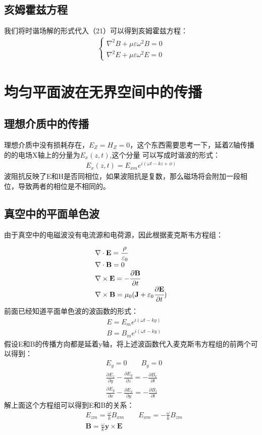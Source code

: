 \documentclass[UTF8]{article}
\begin{document}
\subsection{亥姆霍兹方程}
我们将时谐场解的形式代入（21）可以得到亥姆霍兹方程：
\begin{align}
    \begin{cases}
        \nabla^2 B + \mu \varepsilon \omega^2 B = 0\\
        \nabla^2 E + \mu \varepsilon \omega^2 E = 0
    \end{cases}
\end{align}
\section{均匀平面波在无界空间中的传播}
\subsection{理想介质中的传播}
理想介质中没有损耗存在，$E_Z=H_Z=0$，这个东西需要思考一下，延着Z轴传播的的电场X轴上的分量为$E_x(z,t)$,这个分量
可以写成时谐波的形式：
\begin{align}
    E_x(z,t)=E_{xm}e^{i(\omega t -kz+\phi)}
\end{align}
波阻抗反映了E和H是否同相位，如果波阻抗是复数，那么磁场将会附加一段相位，导致两者的相位是不相同的。
\subsection{真空中的平面单色波}
由于真空中的电磁波没有电流源和电荷源，因此根据麦克斯韦方程组：
\begin{align*}
    \begin{array}{l}  
     \nabla \cdot \mathbf{E} =\cfrac{\rho}{\varepsilon _0}  \\  
     \nabla \cdot \mathbf{B} = 0 \\  
     \nabla \times  \mathbf{E} = -\cfrac{\partial \mathbf{B}}{\partial t }  \\  
     \nabla \times  \mathbf{B} = \mu _0(\mathbf{J} + \varepsilon_0 \cfrac{\partial \mathbf{E}}{\partial t }  )
 \end{array}  
 \end{align*}
前面已经知道平面单色波的波函数的形式：
\begin{align*}
    &E = E_{m} e^{i(\omega t- ky)}\\
    &B = B_{m} e^{i(\omega t- ky)}
\end{align*}
假设E和B的传播方向都是延着y轴，将上述波函数代入麦克斯韦方程组的前两个可以得到：
\begin{align*}
    &E_y = 0 \qquad B_y = 0\\
    &\frac{\partial E_z}{\partial y}-\frac{\partial E_y}{\partial z} =
     -\frac{\partial B_x}{\partial t}\\
     &\frac{\partial E_y}{\partial x}-\frac{\partial E_x}{\partial y} =
     -\frac{\partial B_z}{\partial t}
\end{align*}
解上面这个方程组可以得到E和B的关系：
\begin{align*}
    &E _{zm} = \frac{\omega}{k}B_{xm}\qquad E_{xm} = -\frac{\omega}{k}B_{zm}\\
    &\mathbf{ B} = \frac{\omega}{k} \mathbf{y} \times \mathbf{E} 
\end{align*}
\end{document}
